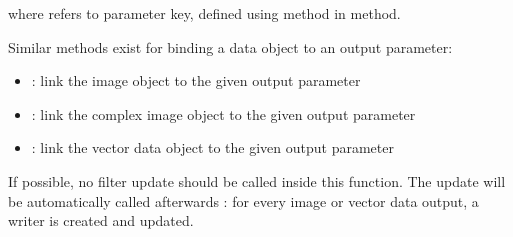 where  refers to parameter key, defined using  method in  method.

Similar methods exist for binding a data object to an output parameter:
\begin{itemize}
  \item {} : link the image object to the given output parameter
  \item {} : link the complex image object to the given output parameter
  \item {} : link the vector data object to the given
  output parameter
\end{itemize}

If possible, no filter update should be called inside this function. The update will be 
automatically called afterwards : for every image or vector data output, a writer is 
created and updated.

